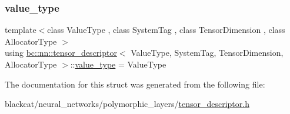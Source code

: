 \subsubsection{\texorpdfstring{value\+\_\+type}{value\_type}}
{\footnotesize\ttfamily template$<$class Value\+Type , class System\+Tag , class Tensor\+Dimension , class Allocator\+Type $>$ \\
using \hyperlink{structbc_1_1nn_1_1tensor__descriptor}{bc\+::nn\+::tensor\+\_\+descriptor}$<$ Value\+Type, System\+Tag, Tensor\+Dimension, Allocator\+Type $>$\+::\hyperlink{structbc_1_1nn_1_1tensor__descriptor_a50cff589c12e4da21525c0ebb04dc54d}{value\+\_\+type} =  Value\+Type}



The documentation for this struct was generated from the following file\+:\begin{DoxyCompactItemize}
\item 
blackcat/neural\+\_\+networks/polymorphic\+\_\+layers/\hyperlink{tensor__descriptor_8h}{tensor\+\_\+descriptor.\+h}\end{DoxyCompactItemize}
